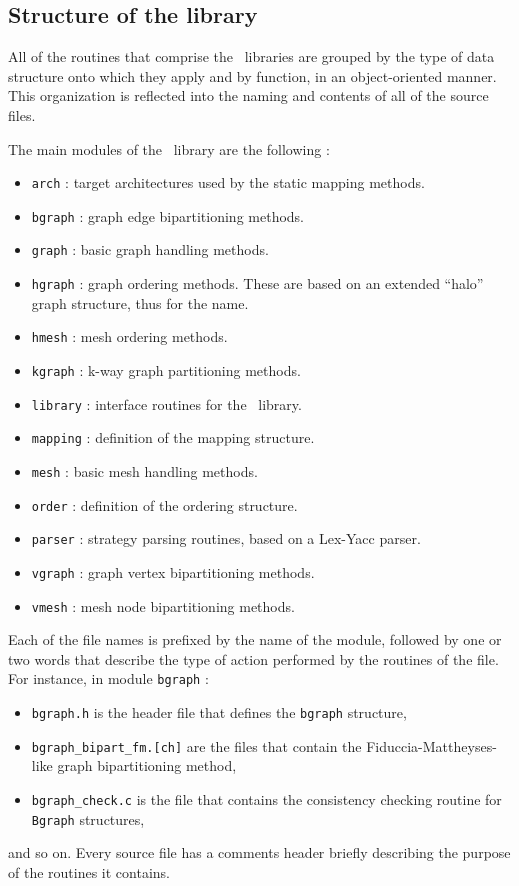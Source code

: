 \subsection{Structure of the library}


All of the routines that comprise the \libscotch\ libraries are
grouped by the type of data structure onto which they apply and by
function, in an object-oriented manner. This organization is reflected
into the naming and contents of all of the source files.

The main modules of the \libscotch\ library are the following :
\begin{itemize}
\item
{\tt arch} : target architectures used by the static mapping methods.
\item
{\tt bgraph} : graph edge bipartitioning methods.
\item
{\tt graph} : basic graph handling methods.
\item
{\tt hgraph} : graph ordering methods. These are based on an extended
``halo'' graph structure, thus for the name.
\item
{\tt hmesh} : mesh ordering methods.
\item
{\tt kgraph} : k-way graph partitioning methods.
\item
{\tt library} : interface routines for the \libscotch\ library.
\item
{\tt mapping} : definition of the mapping structure.
\item
{\tt mesh} : basic mesh handling methods.
\item
{\tt order} : definition of the ordering structure.
\item
{\tt parser} : strategy parsing routines, based on a Lex-Yacc
parser.
\item
{\tt vgraph} : graph vertex bipartitioning methods.
\item
{\tt vmesh} : mesh node bipartitioning methods.
\end{itemize}

Each of the file names is prefixed by the name of the module, followed
by one or two words that describe the type of action performed by the
routines of the file.
For instance, in module {\tt bgraph} :
\begin{itemize}
\item
{\tt bgraph.h} is the header file that defines the {\tt bgraph}
structure,
\item
{\tt bgraph\_bipart\_fm.[ch]} are the files that contain the
Fiduccia-Mattheyses-like graph bipartitioning method,
\item
{\tt bgraph\_check.c} is the file that contains the consistency
checking routine for {\tt Bgraph} structures,
\end{itemize}
and so on. Every source file has a comments header briefly describing
the purpose of the routines it contains.

